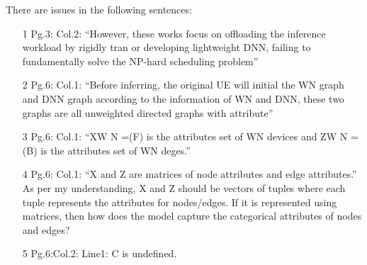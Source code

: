 \documentclass{ar2rc}
\begin{document}
\begin{tcolorbox}[
   title={Reviewer 1: Comment 1},
   colback=gray!10,%
   colframe=black,%
   width=\linewidth,%
   arc=1mm, auto outer arc,
   boxrule=0.5pt,
]
There are issues in the following sentences:
\begin{itemize}
	\item[1] Pg.3: Col.2: “However, these works focus on offloading the inference workload by rigidly tran or developing lightweight DNN, failing to fundamentally solve the NP-hard scheduling problem”

	\item[2] Pg.6: Col.1: “Before inferring, the original UE will initial the WN graph and DNN graph according to the information of WN and DNN, these two graphs are all unweighted directed graphs with attribute”

	\item[3] Pg.6: Col.1: “XW N =(F) is the attributes set of WN devices and ZW N =(B) is the attributes set of WN deges.”
	\item[4] Pg.6: Col.1: “X and Z are matrices of node attributes and edge attributes.” As per my understanding, X and Z should be vectors of tuples where each tuple represents the attributes for nodes/edges. If it is represented using matrices, then how does the model capture the categorical attributes of nodes and edges?
	\item[5] Pg.6:Col.2: Line1:  C is undefined. 

\end{itemize}
\end{tcolorbox}
\end{document}
